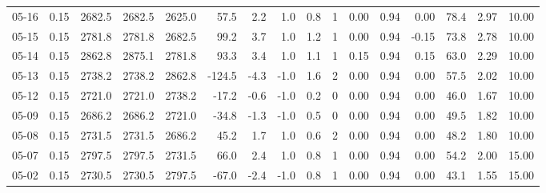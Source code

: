 \begin{threeparttable}
{\begin{tabular}{lrrrrrrrrrrrrrrr}
  05-16 &     0.15 & 2682.5 & 2682.5 & 2625.0 &       57.5 &            2.2 &                      1.0 &                 0.8 &              1 &       0.00 &      0.94 &           0.00 &             78.4 &            2.97 &                  10.00 \\
  05-15 &     0.15 & 2781.8 & 2781.8 & 2682.5 &       99.2 &            3.7 &                      1.0 &                 1.2 &              1 &       0.00 &      0.94 &          -0.15 &             73.8 &            2.78 &                  10.00 \\
  05-14 &     0.15 & 2862.8 & 2875.1 & 2781.8 &       93.3 &            3.4 &                      1.0 &                 1.1 &              1 &       0.15 &      0.94 &           0.15 &             63.0 &            2.29 &                  10.00 \\
  05-13 &     0.15 & 2738.2 & 2738.2 & 2862.8 &     -124.5 &           -4.3 &                     -1.0 &                 1.6 &              2 &       0.00 &      0.94 &           0.00 &             57.5 &            2.02 &                  10.00 \\
  05-12 &     0.15 & 2721.0 & 2721.0 & 2738.2 &      -17.2 &           -0.6 &                     -1.0 &                 0.2 &              0 &       0.00 &      0.94 &           0.00 &             46.0 &            1.67 &                  10.00 \\
  05-09 &     0.15 & 2686.2 & 2686.2 & 2721.0 &      -34.8 &           -1.3 &                     -1.0 &                 0.5 &              0 &       0.00 &      0.94 &           0.00 &             49.5 &            1.82 &                  10.00 \\
  05-08 &     0.15 & 2731.5 & 2731.5 & 2686.2 &       45.2 &            1.7 &                      1.0 &                 0.6 &              2 &       0.00 &      0.94 &           0.00 &             48.2 &            1.80 &                  10.00 \\
  05-07 &     0.15 & 2797.5 & 2797.5 & 2731.5 &       66.0 &            2.4 &                      1.0 &                 0.8 &              1 &       0.00 &      0.94 &           0.00 &             54.2 &            2.00 &                  15.00 \\
  05-02 &     0.15 & 2730.5 & 2730.5 & 2797.5 &      -67.0 &           -2.4 &                     -1.0 &                 0.8 &              1 &       0.00 &      0.94 &           0.00 &             43.1 &            1.55 &                  15.00 \\

\end{tabular}}
\end{threeparttable}
